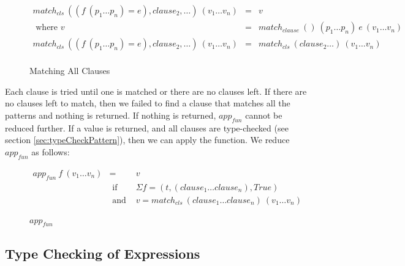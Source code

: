 \documentclass[acmsmall]{acmart}
\begin{document}
\begin{figure}[H]
  \begin{equation*}
    \begin{aligned}
      match_{cls} \: ((f \: (p_1 \dots p_n) = e), clause_2, \dots) \: (v_1 \dots v_n) & = & v                                                               \\
      \textrm{ where } v                                                              & = & match_{clause} \: () \: (p_1 \dots p_n) \: e \: (v_1 \dots v_n) \\
      match_{cls} \: ((f \: (p_1 \dots p_n) = e), clause_2, \dots) \: (v_1 \dots v_n) & = & match_{cls} \: (clause_2 \dots) \: (v_1 \dots v_n)              \\
    \end{aligned}
  \end{equation*}
  \caption{Matching All Clauses}
\end{figure}

Each clause is tried until one is matched or there are no clauses left. If there are no clauses left to match, then we failed to find a clause that matches all the patterns and nothing is returned. If nothing is returned, $app_{fun}$ cannot be reduced further. If a value is returned, and all clauses are type-checked (see section \ref{sec:typeCheckPattern}), then we can apply the function. We reduce $app_{fun}$ as follows:

\begin{figure}[H]
  \begin{equation*}
    \begin{aligned}
      app_{fun} \: f \: (v_1 \dots v_n) & =              & v                                                               \\
                                        & \textrm{ if }  & \Sigma f = (t, (clause_1 \dots clause_n), True)                 \\
                                        & \textrm{ and } & v = match_{cls} \: (clause_1 \dots clause_n) \: (v_1 \dots v_n) \\
    \end{aligned}
  \end{equation*}
  \caption{$app_{fun}$}
\end{figure}

\subsection{Type Checking of Expressions}
\end{document}
